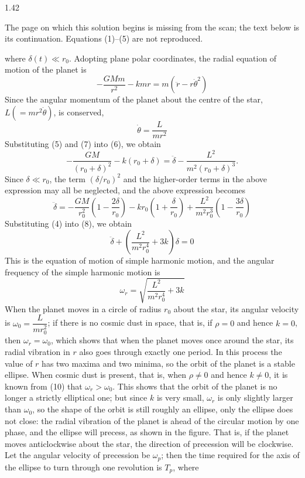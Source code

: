 \begin{solution}{1.42}
\begin{note}
The page on which this solution begins is missing from the scan; the text below is its continuation. Equations (1)--(5) are not reproduced.
\end{note}
where $\delta(t)\ll r_0$. Adopting plane polar coordinates, the radial equation of motion of the planet is
\begin{equation}
-\frac{GMm}{r^2}-kmr=m\left(\ddot r-r\dot\theta^2\right) \tag{6}
\end{equation}
Since the angular momentum of the planet about the centre of the star, $L(=mr^2\dot\theta)$, is conserved,
\begin{equation}
\dot\theta=\frac{L}{mr^2} \tag{7}
\end{equation}
Substituting (5) and (7) into (6), we obtain
\[
-\frac{GM}{(r_0+\delta)^2}-k(r_0+\delta)=\ddot\delta-\frac{L^2}{m^2(r_0+\delta)^3}.
\]
Since $\delta\ll r_0$, the term $(\delta/r_0)^2$ and the higher-order terms in the above expression may all be neglected, and the above expression becomes
\begin{equation}
\ddot\delta=-\frac{GM}{r_0^2}\left(1-\frac{2\delta}{r_0}\right)-kr_0\left(1+\frac{\delta}{r_0}\right)+\frac{L^2}{m^2r_0^3}\left(1-\frac{3\delta}{r_0}\right) \tag{8}
\end{equation}
Substituting (4) into (8), we obtain
\begin{equation}
\ddot\delta+\left(\frac{L^2}{m^2r_0^4}+3k\right)\delta=0 \tag{9}
\end{equation}
This is the equation of motion of simple harmonic motion, and the angular frequency of the simple harmonic motion is
\begin{equation}
\omega_r=\sqrt{\frac{L^2}{m^2r_0^4}+3k} \tag{10}
\end{equation}
When the planet moves in a circle of radius $r_0$ about the star, its angular velocity is $\omega_0=\dfrac{L}{mr_0^2}$; if there is no cosmic dust in space, that is, if $\rho=0$ and hence $k=0$, then $\omega_r=\omega_0$, which shows that when the planet moves once around the star, its radial vibration in $r$ also goes through exactly one period. In this process the value of $r$ has two maxima and two minima, so the orbit of the planet is a stable ellipse. When cosmic dust is present, that is, when $\rho\neq0$ and hence $k\neq0$, it is known from (10) that $\omega_r>\omega_0$. This shows that the orbit of the planet is no longer a strictly elliptical one; but since $k$ is very small, $\omega_r$ is only slightly larger than $\omega_0$, so the shape of the orbit is still roughly an ellipse, only the ellipse does not close: the radial vibration of the planet is ahead of the circular motion by one phase, and the ellipse will precess, as shown in the figure. That is, if the planet moves anticlockwise about the star, the direction of precession will be clockwise. Let the angular velocity of precession be $\omega_p$; then the time required for the axis of the ellipse to turn through one revolution is $T_p$, where

\end{solution}
